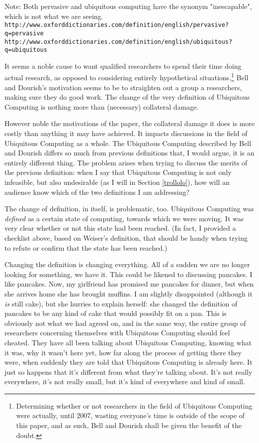 Note: Both pervasive and ubiquitous computing have the synonym "inescapable", which is not what we are seeing.
\verb+http://www.oxforddictionaries.com/definition/english/pervasive?q=pervasive+
\verb+http://www.oxforddictionaries.com/definition/english/ubiquitous?q=ubiquitous+

It seems a noble cause to want qualified researchers to spend their time doing actual research, as opposed to
considering entirely hypothetical situations.\footnote{Determining whether or not researchers in the field of
Ubiquitous Computing were actually, until 2007, wasting everyone's time is outside of the scope of this paper,
and as such, Bell and Dourish shall be given the benefit of the doubt.} Bell and Dourish's motivation seems to
be to straighten out a group a researchers, making sure they do good work. The change of the very definition of
Ubiquitous Computing is nothing more than (necessary) collateral damage.

However noble the motivations of the paper, the collateral damage it does is more costly than anything it may have
achieved. It impacts discussions in the field of Ubiquitous Computing as a whole. The Ubiquitous Computing described
by Bell and Dourish differs so much from previous definitions that, I would argue, it is an entirely different
thing. The problem arises when trying to discuss the merits of the previous definition: when I say that Ubiquitous
Computing is not only infeasible, but also undesirable (as I will in Section \ref{trollolo}), how will an audience
know which of the two definitions I am addressing?

The change of definition, in itself, is problematic, too. Ubiquitous Computing was \emph{defined} as a certain state
of computing, towards which we were moving. It was very clear whether or not this state had been reached. (In fact,
I provided a checklist above, based on Weiser's definition, that should be handy when trying to refute or confirm that
the state has been reached.)

Changing the definition is changing everything. All of a sudden we are no longer looking
for something, we have it. This could be likened to discussing pancakes. I like pancakes. Now, my girlfriend has
promised me pancakes for dinner, but when she arrives home she has brought muffins. I am slightly disappointed (although
it \emph{is} still cake), but she hurries to explain herself: she changed the definition of pancakes to be any kind
of cake that would possibly fit on a pan. This is obviously not what we had agreed on, and in the same way, the entire
group of researchers concerning themselves with Ubiquitous Computing should feel cheated. They have all been talking
about Ubiquitous Computing, knowing what it was, why it wasn't here yet, how far along the process of getting there
they were, when suddenly they are told that Ubiquitous Computing is already here. It just so happens that it's different
from what they're talking about. It's not really everywhere, it's not really small, but it's kind of everywhere and kind
of small.

